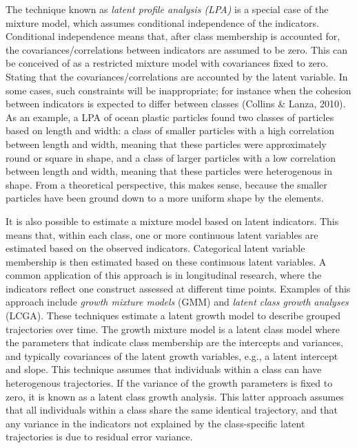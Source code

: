 \documentclass[
  ,man,floatsintext]{apa6}
\begin{document}
The technique known as \emph{latent profile analysis (LPA)} is a special case
of the mixture model, which assumes conditional independence of the
indicators. Conditional independence means that, after class membership
is accounted for, the covariances/correlations between indicators are
assumed to be zero. This can be conceived of as a restricted mixture
model with covariances fixed to zero. Stating that the covariances/correlations are accounted by the latent variable. In some cases, such constraints
will be inappropriate; for instance when the cohesion between indicators
is expected to differ between classes (Collins \& Lanza, 2010). As an example, a LPA of ocean
plastic particles found two classes of particles based on length and
width: a class of smaller particles with a high correlation between
length and width, meaning that these particles were approximately round
or square in shape, and a class of larger particles with a low
correlation between length and width, meaning that these particles were
heterogenous in shape. From a theoretical perspective, this makes sense,
because the smaller particles have been ground down to a more uniform
shape by the elements.

It is also possible to estimate a mixture model based on latent
indicators. This means that, within each class, one or more continuous
latent variables are estimated based on the observed indicators.
Categorical latent variable membership is then estimated based on these
continuous latent variables. A common application of this approach is in
longitudinal research, where the indicators reflect one construct
assessed at different time points. Examples of this approach include
\emph{growth mixture models} (GMM) and \emph{latent class growth analyses} (LCGA).
These techniques estimate a latent growth model to describe grouped
trajectories over time. The growth mixture model is a latent class model
where the parameters that indicate class membership are the intercepts
and variances, and typically covariances of the latent growth variables,
e.g., a latent intercept and slope. This technique assumes that
individuals within a class can have heterogenous trajectories. If the
variance of the growth parameters is fixed to zero, it is known as a
latent class growth analysis. This latter approach assumes that all
individuals within a class share the same identical trajectory, and that
any variance in the indicators not explained by the class-specific
latent trajectories is due to residual error variance.
\end{document}
